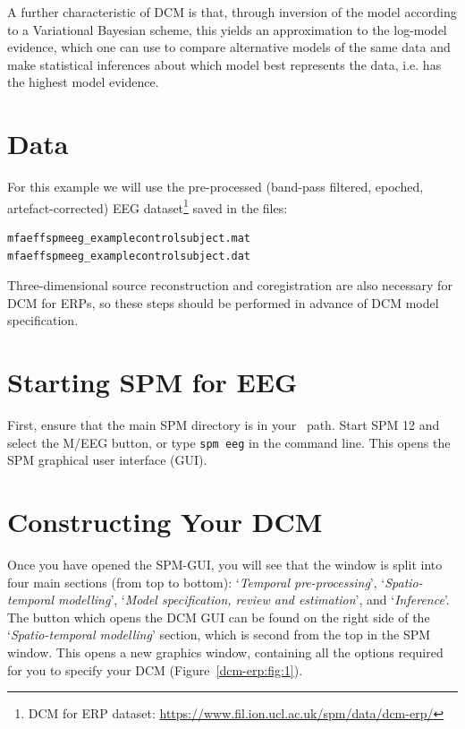 A further characteristic of DCM is that, through inversion of the model
according to a Variational Bayesian scheme, this yields an approximation
to the log-model evidence, which one can use to compare alternative
models of the same data and make statistical inferences about which
model best represents the data, i.e. has the highest model evidence.

\section{Data}

For this example we will use the pre-processed (band-pass filtered,
epoched, artefact-corrected) EEG dataset\footnote{DCM for ERP dataset: \url{https://www.fil.ion.ucl.ac.uk/spm/data/dcm-erp/}} saved in the files:

\begin{verbatim}
mfaeffspmeeg_examplecontrolsubject.mat
mfaeffspmeeg_examplecontrolsubject.dat
\end{verbatim}

Three-dimensional source reconstruction and coregistration are also
necessary for DCM for ERPs, so these steps should be performed in
advance of DCM model specification.

\section{Starting SPM for EEG}

First, ensure that the main SPM directory is in your \matlab\ path. Start
SPM 12 and select the M/EEG button, or type \texttt{spm eeg} in the command line.
This opens the SPM graphical user interface (GUI).

\section{Constructing Your DCM}

Once you have opened the SPM-GUI, you will see that the window is split
into four main sections (from top to bottom): `\emph{Temporal
pre-processing}', `\emph{Spatio-temporal modelling}', `\emph{Model
specification, review and estimation}', and `\emph{Inference}'. The
button which opens the DCM GUI can be found on the right side of the
`\emph{Spatio-temporal modelling}' section, which is second from the top
in the SPM window. This opens a new graphics window, containing all the
options required for you to specify your DCM (Figure~\ref{dcm-erp:fig:1}).


